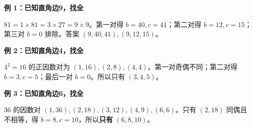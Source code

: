 \clearpage
\begin{examplebox}
\textbf{\textcolor{CExample}{例 1：已知直角边9，找全}}
\par\medskip
\begin{center}

\end{center}
\medskip
$81=1\times81=3\times27=9\times9$。第一对得 $b=40,c=41$；第二对得 $b=12,c=15$；第三对 $b=0$ 排除。答案 $(9,40,41),(9,12,15)$。
\end{examplebox}
\clearpage
\begin{examplebox}
\textbf{\textcolor{CExample}{例 2：已知直角边4，找全}}
\par\medskip
\begin{center}

\end{center}
\medskip
$4^2=16$ 的正因数对为 $(1,16),(2,8),(4,4)$。第一对奇偶不同；第二对得 $b=3,c=5$；最后一对 $b=0$。所以只有 $\boxed{(3,4,5)}$。
\end{examplebox}
\clearpage
\begin{examplebox}
\textbf{\textcolor{CExample}{例 3：已知直角边6，找全}}
\par\medskip
\begin{center}

\end{center}
\medskip
$36$ 的因数对 $(1,36),(2,18),(3,12),(4,9),(6,6)$。只有 $(2,18)$ 同偶且不相等，得 $b=8,c=10$，所以\textbf{只有} $(6,8,10)$。
\end{examplebox}
